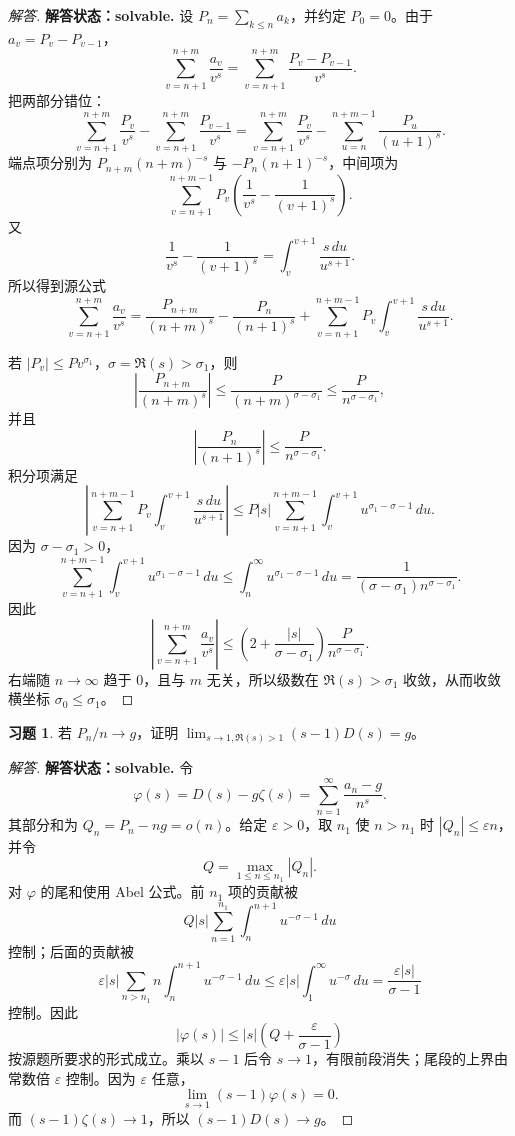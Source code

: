 \documentclass[11pt,a4paper,openany]{ctexbook}
\numberwithin{equation}{chapter}
\theoremstyle{plain}
\theoremstyle{definition}
\newtheorem{exercise}[theorem]{习题}
\theoremstyle{remark}
\begin{document}
\begin{proof}[解答]
\textbf{解答状态：solvable.}
设 $P_n=\sum_{k\le n}a_k$，并约定 $P_0=0$。由于 $a_v=P_v-P_{v-1}$，
\[
\sum_{v=n+1}^{n+m}\frac{a_v}{v^s}
=\sum_{v=n+1}^{n+m}\frac{P_v-P_{v-1}}{v^s}.
\]
把两部分错位：
\[
\sum_{v=n+1}^{n+m}\frac{P_v}{v^s}
-\sum_{v=n+1}^{n+m}\frac{P_{v-1}}{v^s}
=
\sum_{v=n+1}^{n+m}\frac{P_v}{v^s}
-\sum_{u=n}^{n+m-1}\frac{P_u}{(u+1)^s}.
\]
端点项分别为 $P_{n+m}(n+m)^{-s}$ 与 $-P_n(n+1)^{-s}$，中间项为
\[
\sum_{v=n+1}^{n+m-1}P_v
\left(\frac1{v^s}-\frac1{(v+1)^s}\right).
\]
又
\[
\frac1{v^s}-\frac1{(v+1)^s}
=\int_v^{v+1}\frac{s\,du}{u^{s+1}}.
\]
所以得到源公式
\[
\sum_{v=n+1}^{n+m}\frac{a_v}{v^s}
=\frac{P_{n+m}}{(n+m)^s}-\frac{P_n}{(n+1)^s}
+\sum_{v=n+1}^{n+m-1}P_v\int_v^{v+1}\frac{s\,du}{u^{s+1}}.
\]

若 $|P_v|\le Pv^{\sigma_1}$，$\sigma=\Re(s)>\sigma_1$，则
\[
\left|\frac{P_{n+m}}{(n+m)^s}\right|\le \frac{P}{(n+m)^{\sigma-\sigma_1}}
\le \frac{P}{n^{\sigma-\sigma_1}},
\]
并且
\[
\left|\frac{P_n}{(n+1)^s}\right|\le \frac{P}{n^{\sigma-\sigma_1}}.
\]
积分项满足
\[
\left|
\sum_{v=n+1}^{n+m-1}P_v\int_v^{v+1}\frac{s\,du}{u^{s+1}}
\right|
\le
P|s|\sum_{v=n+1}^{n+m-1}\int_v^{v+1}u^{\sigma_1-\sigma-1}\,du.
\]
因为 $\sigma-\sigma_1>0$，
\[
\sum_{v=n+1}^{n+m-1}\int_v^{v+1}u^{\sigma_1-\sigma-1}\,du
\le
\int_n^\infty u^{\sigma_1-\sigma-1}\,du
=\frac1{(\sigma-\sigma_1)n^{\sigma-\sigma_1}}.
\]
因此
\[
\left|\sum_{v=n+1}^{n+m}\frac{a_v}{v^s}\right|
\le
\left(2+\frac{|s|}{\sigma-\sigma_1}\right)
\frac{P}{n^{\sigma-\sigma_1}}.
\]
右端随 $n\to\infty$ 趋于 $0$，且与 $m$ 无关，所以级数在
$\Re(s)>\sigma_1$ 收敛，从而收敛横坐标 $\sigma_0\le\sigma_1$。
\end{proof}

\begin{exercise}
若 $P_n/n\to g$，证明 $\lim_{s\to1,\Re(s)>1}(s-1)D(s)=g$。
\end{exercise}

\begin{proof}[解答]
\textbf{解答状态：solvable.}
令
\[
\varphi(s)=D(s)-g\zeta(s)
=\sum_{n=1}^\infty \frac{a_n-g}{n^s}.
\]
其部分和为 $Q_n=P_n-ng=o(n)$。给定 $\varepsilon>0$，取 $n_1$ 使 $n>n_1$ 时 $|Q_n|\le\varepsilon n$，并令
\[
Q=\max_{1\le n\le n_1}|Q_n|.
\]
对 $\varphi$ 的尾和使用 Abel 公式。前 $n_1$ 项的贡献被
\[
Q|s|\sum_{n=1}^{n_1}\int_n^{n+1}u^{-\sigma-1}\,du
\]
控制；后面的贡献被
\[
\varepsilon |s|\sum_{n>n_1}n\int_n^{n+1}u^{-\sigma-1}\,du
\le
\varepsilon |s|\int_1^\infty u^{-\sigma}\,du
=\frac{\varepsilon |s|}{\sigma-1}
\]
控制。因此
\[
|\varphi(s)|\le |s|\left(Q+\frac{\varepsilon}{\sigma-1}\right)
\]
按源题所要求的形式成立。乘以 $s-1$ 后令 $s\to1$，有限前段消失；尾段的上界由常数倍
$\varepsilon$ 控制。因为 $\varepsilon$ 任意，
\[
\lim_{s\to1}(s-1)\varphi(s)=0.
\]
而 $(s-1)\zeta(s)\to1$，所以 $(s-1)D(s)\to g$。
\end{proof}
\end{document}
